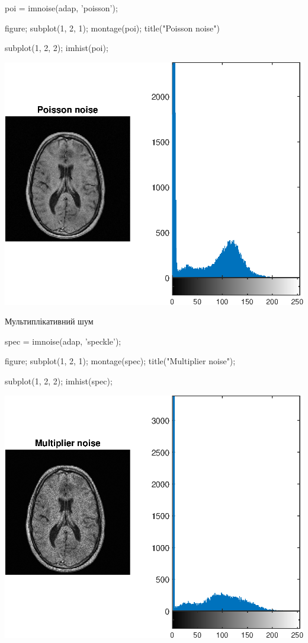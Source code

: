 \documentclass[12pt]{article}
\begin{document}
\begin{matlabcode}
poi = imnoise(adap, 'poisson');

figure;
subplot(1, 2, 1);
montage(poi);
title("Poisson noise")

subplot(1, 2, 2);
imhist(poi);
\end{matlabcode}
\begin{center}
\includegraphics[width=\maxwidth{56.196688409433015em}]{figure_5}
\end{center}

\begin{par}
\begin{flushleft}
Мультиплікативний шум
\end{flushleft}
\end{par}

\begin{matlabcode}
spec = imnoise(adap, 'speckle');

figure;
subplot(1, 2, 1);
montage(spec);
title("Multiplier noise");

subplot(1, 2, 2);
imhist(spec);
\end{matlabcode}
\begin{center}
\includegraphics[width=\maxwidth{56.196688409433015em}]{figure_6}
\end{center}
\end{document}

